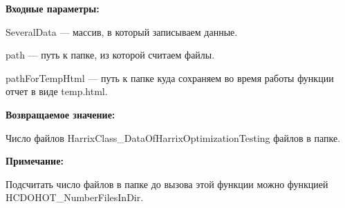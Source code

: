 \textbf{Входные параметры:}
 
    SeveralData --- массив, в который записываем данные.
 
    path --- путь к папке, из которой считаем файлы.
 
    pathForTempHtml --- путь к папке куда сохраняем во время работы функции отчет в виде temp.html.

\textbf{Возвращаемое значение:}

Число файлов HarrixClass\_DataOfHarrixOptimizationTesting файлов в папке.

\textbf{Примечание:}

Подсчитать число файлов в папке до вызова этой функции можно функцией HCDOHOT\_NumberFilesInDir.
